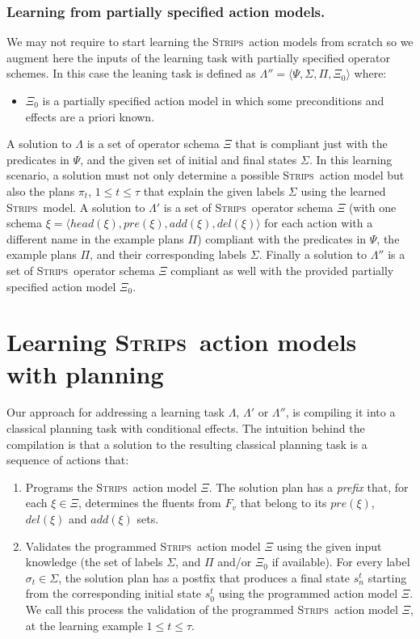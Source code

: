 \documentclass[letterpaper]{article} %
\newcommand{\tup}[1]{{\langle #1 \rangle}}
\newcommand{\strips}{\textsc{Strips}}     %
\begin{document}
\subsubsection{Learning from partially specified action models.}
We may not require to start learning the \strips\ action models from scratch so we augment here the inputs of the learning task with partially specified operator schemes. In this case the leaning task is defined as $\Lambda''=\tup{\Psi,\Sigma,\Pi,\Xi_0}$ where:
\begin{itemize}
\item $\Xi_0$ is a partially specified action model in which some preconditions and effects are a priori known.
\end{itemize}

A solution to $\Lambda$ is a set of operator schema $\Xi$ that is compliant just with the predicates in $\Psi$, and the given set of initial and final states $\Sigma$. In this learning scenario, a solution must not only determine a possible \strips\ action model but also the plans $\pi_t$, {\tt\small $1\leq t\leq \tau$} that explain the given labels $\Sigma$ using the learned \strips\ model. A solution to $\Lambda'$ is a set of \strips\ operator schema $\Xi$ (with one schema $\xi=\tup{head(\xi),pre(\xi),add(\xi),del(\xi)}$ for each action with a different name in the example plans $\Pi$) compliant with the predicates in $\Psi$, the example plans $\Pi$, and their corresponding labels $\Sigma$.  Finally a solution to $\Lambda''$ is a set of \strips\ operator schema $\Xi$ compliant as well with the provided partially specified action model $\Xi_0$.


\section{Learning \strips\ action models with planning}
Our approach for addressing a learning task $\Lambda$, $\Lambda'$ or $\Lambda''$, is compiling it into a classical planning task with conditional effects. The intuition behind the compilation is that a solution to the resulting classical planning task is a sequence of actions that:
\begin{enumerate}
\item Programs the \strips\ action model $\Xi$. The solution plan has a {\em prefix} that, for each $\xi\in\Xi$, determines the fluents from $F_v$ that belong to its $pre(\xi)$, $del(\xi)$ and $add(\xi)$ sets.
\item Validates the programmed \strips\ action model $\Xi$ using the given input knowledge (the set of labels $\Sigma$, and $\Pi$ and/or $\Xi_0$ if available). For every label $\sigma_t\in \Sigma$, the solution plan has a postfix that produces a final state $s_{n}^t$ starting from the corresponding initial state $s_0^t$ using the programmed action model $\Xi$. We call this process the validation of the programmed \strips\ action model $\Xi$, at the learning example {\small $1\leq t\leq \tau$}. %
\end{enumerate}
\end{document}
